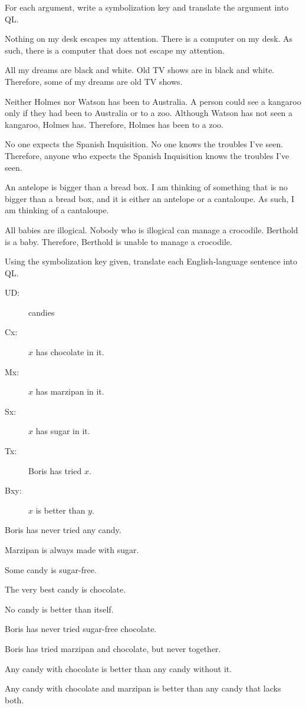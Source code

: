 \problempart
\label{pr.QLarguments}
For each argument, write a symbolization key and translate the argument into QL.
\begin{kormanize}
\item Nothing on my desk escapes my attention. There is a computer on my desk. As such, there is a computer that does not escape my attention.
\item All my dreams are black and white. Old TV shows are in black and white. Therefore, some of my dreams are old TV shows.
\item Neither Holmes nor Watson has been to Australia. A person could see a kangaroo only if they had been to Australia or to a zoo. Although Watson has not seen a kangaroo, Holmes has. Therefore, Holmes has been to a zoo.
\item No one expects the Spanish Inquisition. No one knows the troubles I've seen. Therefore, anyone who expects the Spanish Inquisition knows the troubles I've seen.
\item An antelope is bigger than a bread box. I am thinking of something that is no bigger than a bread box, and it is either an antelope or a cantaloupe. As such, I am thinking of a cantaloupe.
\item All babies are illogical. Nobody who is illogical can manage a crocodile. Berthold is a baby. Therefore, Berthold is unable to manage a crocodile.
\end{kormanize}


\problempart
\label{pr.QLcandies}
Using the symbolization key given, translate each English-language sentence into QL.
\begin{description}
\item[UD:] candies
\item[Cx:] $x$ has chocolate in it.
\item[Mx:] $x$ has marzipan in it.
\item[Sx:] $x$ has sugar in it.
\item[Tx:] Boris has tried $x$.
\item[Bxy:] $x$ is better than $y$.
\end{description}
\begin{kormanize}
\item Boris has never tried any candy.
\item Marzipan is always made with sugar.
\item Some candy is sugar-free.
\item The very best candy is chocolate.
\item No candy is better than itself.
\item Boris has never tried sugar-free chocolate.
\item Boris has tried marzipan and chocolate, but never together.
\item Any candy with chocolate is better than any candy without it.
\item Any candy with chocolate and marzipan is better than any candy that lacks both.
\end{kormanize}




